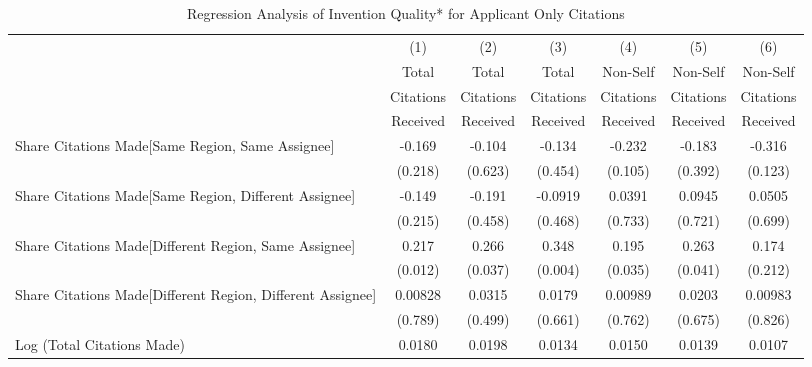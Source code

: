 \documentclass[12pt,letterpaper]{article}
\begin{document}
\begin{table}[htbp]\centering \caption{Regression Analysis of Invention Quality* for Applicant Only Citations  \label{ainf.model123192021}}
\scriptsize
\singlespacing
\begin{tabular}{l*{6}{c}} \hline
                &\multicolumn{1}{c}{(1)}&\multicolumn{1}{c}{(2)}&\multicolumn{1}{c}{(3)}&\multicolumn{1}{c}{(4)}&\multicolumn{1}{c}{(5)}&\multicolumn{1}{c}{(6)}\\
                &\multicolumn{1}{c}{Total}&\multicolumn{1}{c}{Total}&\multicolumn{1}{c}{Total}&\multicolumn{1}{c}{Non-Self}&\multicolumn{1}{c}{Non-Self}&\multicolumn{1}{c}{Non-Self}\\
                &\multicolumn{1}{c}{Citations}&\multicolumn{1}{c}{Citations}&\multicolumn{1}{c}{Citations}&\multicolumn{1}{c}{Citations}&\multicolumn{1}{c}{Citations}&\multicolumn{1}{c}{Citations}\\
                 &\multicolumn{1}{c}{Received}&\multicolumn{1}{c}{Received}&\multicolumn{1}{c}{Received}&\multicolumn{1}{c}{Received}&\multicolumn{1}{c}{Received}&\multicolumn{1}{c}{Received}\\
\hline
Share Citations Made[Same Region, Same Assignee]&   -0.169         &   -0.104         &   -0.134&-0.232         &   -0.183         &   -0.316 \\
                &   (0.218)         &  (0.623)         &  (0.454)&   (0.105)         &  (0.392)         &  (0.123) \\
Share Citations Made[Same Region, Different Assignee]&    -0.149         &   -0.191         &  -0.0919&    0.0391         &   0.0945         &   0.0505 \\
                &   (0.215)         &  (0.458)         &  (0.468) &   (0.733)         &  (0.721)         &  (0.699) \\
Share Citations Made[Different Region, Same Assignee]&     0.217  &    0.266  &    0.348&    0.195  &    0.263  &    0.174 \\
                &(0.012)         &  (0.037)         &  (0.004) &   (0.035)         &  (0.041)         &  (0.212)\\
Share Citations Made[Different Region, Different Assignee]&  0.00828         &   0.0315         &   0.0179&   0.00989         &   0.0203         &  0.00983  \\
                &  (0.789)         &  (0.499)         &  (0.661)&    (0.762)         &  (0.675)         &  (0.826)         \\
Log (Total Citations Made)&    0.0180&   0.0198&   0.0134&     0.0150&   0.0139  &   0.0107 \\

\end{tabular}
\end{table}
\end{document}

